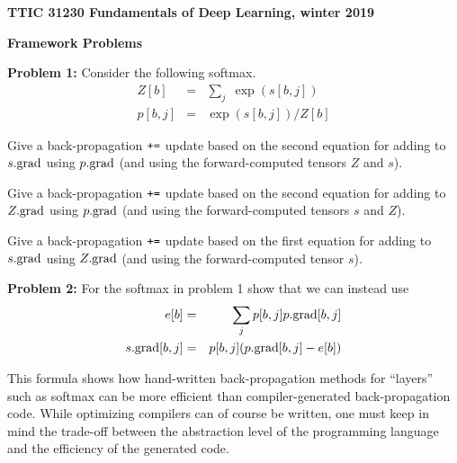 \documentclass{article}
\begin{document}
\centerline{\bf TTIC 31230 Fundamentals of Deep Learning, winter 2019}
\centerline{\bf Framework Problems}

\bigskip
{\bf Problem 1:} Consider the following softmax.
\begin{eqnarray*}
  Z[b] & = & \sum_j\;\exp(s[b,j]) \\
  p[b,j] & = & \exp(s[b,j])/Z[b]
\end{eqnarray*}

Give a back-propagation $\mbox{\tt +=}$ update based on the second equation for adding to $s.\mathrm{grad}$ using $p.\mathrm{grad}$
(and using the forward-computed tensors $Z$ and $s$).

\medskip
Give a back-propagation $\mbox{\tt +=}$ update based on the second equation for adding to $Z.\mathrm{grad}$ using $p.\mathrm{grad}$
(and using the forward-computed tensors $s$ and $Z$).

\medskip
Give a back-propagation $\mbox{\tt +=}$ update based on the first equation for adding to $s.\mathrm{grad}$ using $Z.\mathrm{grad}$
(and using the forward-computed tensor $s$).

\bigskip
{\bf Problem 2:} For the softmax in problem 1 show that we can instead use
\begin{eqnarray*}
  e[b] & = & \sum_j p[b,j]p.\mathrm{grad}[b,j] \\
  s.\mathrm{grad}[b,j] & = & p[b,j](p.\mathrm{grad}[b,j] - e[b])
\end{eqnarray*}

This formula shows how hand-written back-propagation methods for ``layers'' such as softmax
can be more efficient than compiler-generated back-propagation code.
While optimizing compilers can of course be written, one must keep in mind the trade-off
between the abstraction level of the programming language and the efficiency of the generated code.
\end{document}
